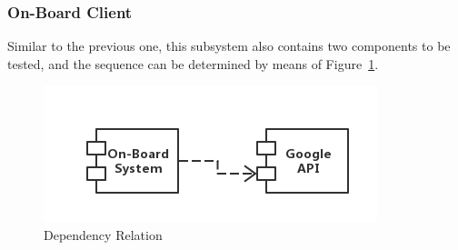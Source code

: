 \documentclass[a4paper,11pt]{article}
\begin{document}
	\subsubsection{On-Board Client}
	Similar to the previous one, this subsystem also contains two components to be tested, and the sequence can be determined by means of Figure~\ref{fig-depo}.
		\begin{figure}[H]
   			\centering
  			\includegraphics[width=\textwidth]{images/depo}
  	    		\caption{Dependency Relation}\label{fig-depo}
		\end{figure}
\end{document}
